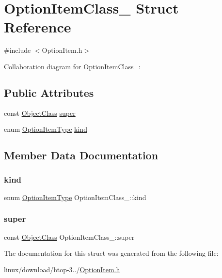 \hypertarget{structOptionItemClass__}{}\section{Option\+Item\+Class\+\_\+ Struct Reference}
\label{structOptionItemClass__}


{\ttfamily \#include $<$Option\+Item.\+h$>$}



Collaboration diagram for Option\+Item\+Class\+\_\+\+:
\subsection*{Public Attributes}
\begin{DoxyCompactItemize}
\item 
const \hyperlink{Object_8h_a6feb151c3b8f61fae503dfbcdc3d6a54}{Object\+Class} \hyperlink{structOptionItemClass___a7d59577e986f87259b53f0cbd43dcfc2}{super}
\item 
enum \hyperlink{OptionItem_8h_a7691fd89aaf5574f919536db7230b07e}{Option\+Item\+Type} \hyperlink{structOptionItemClass___aa2cffea1de97e6af8b9df837e744c8c8}{kind}
\end{DoxyCompactItemize}


\subsection{Member Data Documentation}
\mbox{\label{structOptionItemClass___aa2cffea1de97e6af8b9df837e744c8c8}} 
\subsubsection{\texorpdfstring{kind}{kind}}
{\footnotesize\ttfamily enum \hyperlink{OptionItem_8h_a7691fd89aaf5574f919536db7230b07e}{Option\+Item\+Type} Option\+Item\+Class\+\_\+\+::kind}

\mbox{\label{structOptionItemClass___a7d59577e986f87259b53f0cbd43dcfc2}} 
\subsubsection{\texorpdfstring{super}{super}}
{\footnotesize\ttfamily const \hyperlink{Object_8h_a6feb151c3b8f61fae503dfbcdc3d6a54}{Object\+Class} Option\+Item\+Class\+\_\+\+::super}



The documentation for this struct was generated from the following file\+:\begin{DoxyCompactItemize}
\item 
linux/download/htop-\/3../\hyperlink{OptionItem_8h}{Option\+Item.\+h}\end{DoxyCompactItemize}
